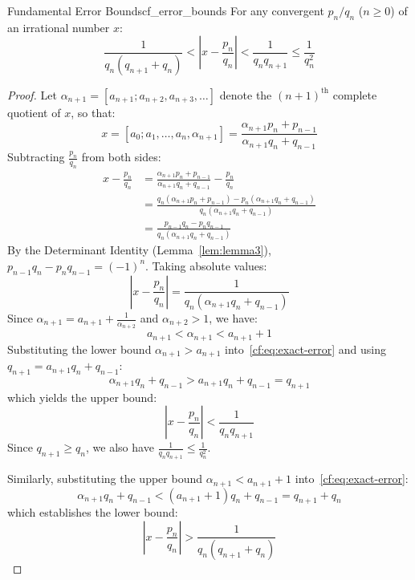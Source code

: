\documentclass[a4paper]{article}
\begin{document}
\begin{mytheorem}{Fundamental Error Bounds}{cf_error_bounds}
  For any convergent $p_n/q_n$ ($n \ge 0$) of an irrational number $x$:
  \[
    \frac{1}{q_n (q_{n+1} + q_n)} < \left| x - \frac{p_n}{q_n} \right| < \frac{1}{q_n q_{n+1}} \le \frac{1}{q_n^2}
  \]

  \begin{proof}
    Let $\alpha_{n+1} = [a_{n+1}; a_{n+2}, a_{n+3}, \dots]$ denote the $(n+1)^{\text{th}}$ complete quotient of $x$, so that:
    \[
      x = [a_0; a_1, \dots, a_n, \alpha_{n+1}] = \frac{\alpha_{n+1} p_n + p_{n-1}}{\alpha_{n+1} q_n + q_{n-1}}
    \]
    Subtracting $\frac{p_n}{q_n}$ from both sides:
    \begin{align*}
      x - \frac{p_n}{q_n} & = \frac{\alpha_{n+1} p_n + p_{n-1}}{\alpha_{n+1} q_n + q_{n-1}} - \frac{p_n}{q_n} \\
      & = \frac{q_n (\alpha_{n+1} p_n + p_{n-1}) - p_n (\alpha_{n+1} q_n + q_{n-1})}{q_n (\alpha_{n+1} q_n + q_{n-1})} \\
      & = \frac{p_{n-1} q_n - p_n q_{n-1}}{q_n (\alpha_{n+1} q_n + q_{n-1})}
    \end{align*}
    By the Determinant Identity (Lemma~\ref{lem:lemma3}), $p_{n-1} q_n - p_n q_{n-1} = (-1)^n$.
    Taking absolute values:
    \begin{equation}\label{cf:eq:exact-error}
      \left| x - \frac{p_n}{q_n} \right| = \frac{1}{q_n (\alpha_{n+1} q_n + q_{n-1})}
    \end{equation}
    Since $\alpha_{n+1} = a_{n+1} + \frac{1}{\alpha_{n+2}}$ and $\alpha_{n+2} > 1$, we have:
    \[
      a_{n+1} < \alpha_{n+1} < a_{n+1} + 1
    \]
    Substituting the lower bound $\alpha_{n+1} > a_{n+1}$ into~\eqref{cf:eq:exact-error} and using $q_{n+1} = a_{n+1} q_n + q_{n-1}$:
    \[
      \alpha_{n+1} q_n + q_{n-1} > a_{n+1} q_n + q_{n-1} = q_{n+1}
    \]
    which yields the upper bound:
    \[
      \left| x - \frac{p_n}{q_n} \right| < \frac{1}{q_n q_{n+1}}
    \]
    Since $q_{n+1} \ge q_n$, we also have $\frac{1}{q_n q_{n+1}} \le \frac{1}{q_n^2}$.

    Similarly, substituting the upper bound $\alpha_{n+1} < a_{n+1} + 1$ into~\eqref{cf:eq:exact-error}:
    \[
      \alpha_{n+1} q_n + q_{n-1} < (a_{n+1} + 1) q_n + q_{n-1} = q_{n+1} + q_n
    \]
    which establishes the lower bound:
    \[
      \left| x - \frac{p_n}{q_n} \right| > \frac{1}{q_n (q_{n+1} + q_n)}
    \]
  \end{proof}
\end{mytheorem}
\end{document}
